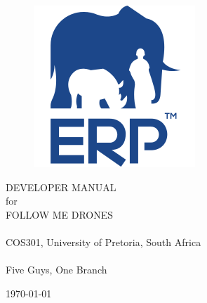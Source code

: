 \documentclass[a4paper,11pt]{book}
\begin{document}
\begin{titlepage}
	\begin{figure}[h!]
		\centering
		\includegraphics[scale=0.5]{./assets/images/erp-logo.png}
		\label{fig: erp-logo}
		\caption{}
	\end{figure}
	\vspace{0.5cm}
	\begin{center}
		\Huge{DEVELOPER MANUAL}\\
		for\\
		FOLLOW ME DRONES\\
		~\\
		\LARGE{COS301, University of Pretoria, South Africa}\\
		~\\
		Five Guys, One Branch
	\end{center}
	\begin{center}
		\today
	\end{center}
\end{titlepage}
\let\cleardoublepage\clearpage

\tableofcontents

\mainmatter










\end{document}
